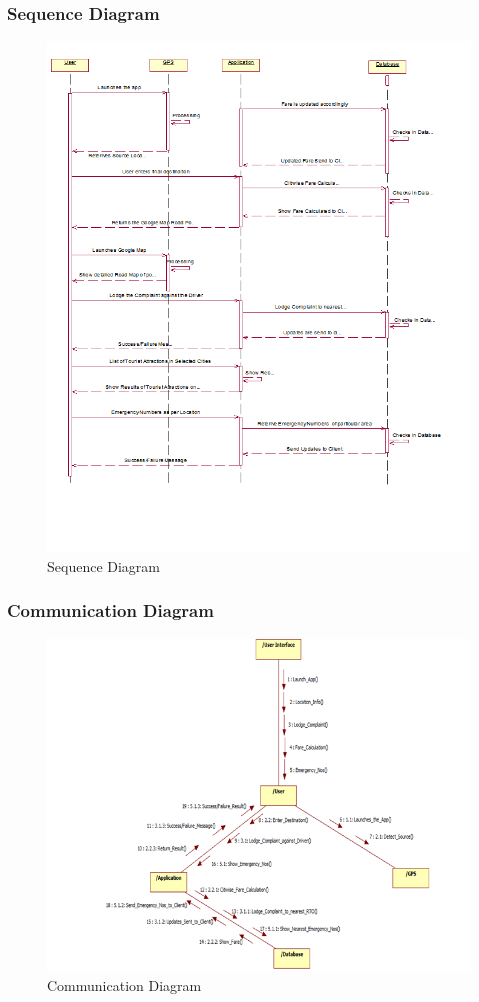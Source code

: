 \documentclass[12pt,a4paper]{article}
\begin{document}
{{{{{{\subsubsection{Sequence Diagram}
\begin{figure}[!htb]
\centering
\includegraphics[width=15 cm]{Seq}
\caption{Sequence Diagram}
\end{figure}
\newpage
\subsubsection{Communication Diagram}
\begin{figure}[!htb]
\centering
\includegraphics[width=15 cm]{communication}
\caption{Communication Diagram}
\end{figure}
\newpage
}}}}}}
\end{document}
